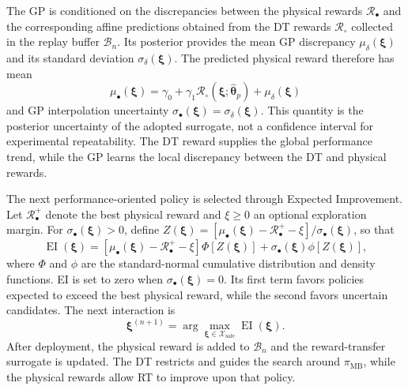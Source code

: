 \documentclass[journal]{IEEEtran}
\begin{document}
The GP is conditioned on the discrepancies between the physical rewards $\mathcal R_{\bullet}$ and the corresponding affine predictions obtained from the DT rewards $\mathcal R_{\circ}$ collected in the replay buffer $\mathcal B_n$. Its posterior provides the mean GP discrepancy $\mu_{\delta}(\boldsymbol\xi)$ and its standard deviation $\sigma_{\delta}(\boldsymbol\xi)$. The predicted physical reward therefore has mean
\begin{equation}
\mu_{\bullet}(\boldsymbol\xi)=
\gamma_0+
\gamma_1\mathcal R_{\circ}
(\boldsymbol\xi;\widehat{\boldsymbol{\theta}}_p)
+\mu_{\delta}(\boldsymbol\xi)
\label{eq:rt-surrogate-mean}
\end{equation}
and GP interpolation uncertainty $\sigma_{\bullet}(\boldsymbol\xi)=\sigma_{\delta}(\boldsymbol\xi)$. This quantity is the posterior uncertainty of the adopted surrogate, not a confidence interval for experimental repeatability. The DT reward supplies the global performance trend, while the GP learns the local discrepancy between the DT and physical rewards.

The next performance-oriented policy is selected through Expected Improvement. Let $\mathcal R_{\bullet}^{+}$ denote the best physical reward and $\xi\geq0$ an optional exploration margin. For $\sigma_{\bullet}(\boldsymbol\xi)>0$, define $Z(\boldsymbol\xi)=[\mu_{\bullet}(\boldsymbol\xi)-\mathcal R_{\bullet}^{+}-\xi]/\sigma_{\bullet}(\boldsymbol\xi)$, so that
\begin{equation}
\operatorname{EI}(\boldsymbol\xi)=
\left[\mu_{\bullet}(\boldsymbol\xi)-\mathcal R_{\bullet}^{+}-\xi\right]
\Phi\!\left[Z(\boldsymbol\xi)\right]
+
\sigma_{\bullet}(\boldsymbol\xi)
\phi\!\left[Z(\boldsymbol\xi)\right],
\label{eq:rt-expected-improvement}
\end{equation}
where $\Phi$ and $\phi$ are the standard-normal cumulative distribution and density functions. EI is set to zero when $\sigma_{\bullet}(\boldsymbol\xi)=0$. Its first term favors policies expected to exceed the best physical reward, while the second favors uncertain candidates. The next interaction is
\begin{equation}
\boldsymbol\xi^{(n+1)}
=
\arg\max_{\boldsymbol\xi\in\mathcal X_{\mathrm{safe}}}
\operatorname{EI}(\boldsymbol\xi).
\label{eq:rt-next-performance}
\end{equation}
After deployment, the physical reward is added to $\mathcal B_n$ and the reward-transfer surrogate is updated. The DT restricts and guides the search around $\pi_{\mathrm{MB}}$, while the physical rewards allow RT to improve upon that policy.
\end{document}
